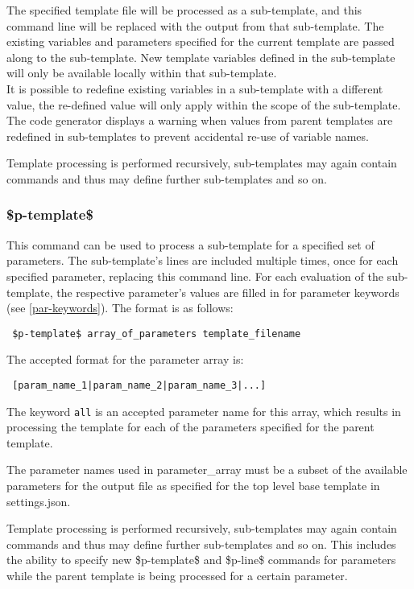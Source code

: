 \documentclass{settings/TU_Delft_Report}
\begin{document}
The specified template file will be processed as a sub-template, and this command line will be replaced with the output from that sub-template. The existing variables and parameters specified for the current template are passed along to the sub-template. New template variables defined in the sub-template will only be available locally within that sub-template.\\

It is possible to redefine existing variables in a sub-template with a different value, the re-defined value will only apply within the scope of the sub-template. The code generator displays a warning when values from parent templates are redefined in sub-templates to prevent accidental re-use of variable names.

Template processing is performed recursively, sub-templates may again contain commands and thus may define further sub-templates and so on.

\subsubsection{\$p-template\$} \label{p-template}
This command can be used to process a sub-template for a specified set of parameters. The sub-template's lines are included multiple times, once for each specified parameter, replacing this command line. For each evaluation of the sub-template, the respective parameter's values are filled in for parameter keywords (see \ref{par-keywords}). The format is as follows:
\begin{lstlisting}
 $p-template$ array_of_parameters template_filename
\end{lstlisting}
The accepted format for the parameter array is:
\begin{lstlisting}
 [param_name_1|param_name_2|param_name_3|...]
\end{lstlisting}
The keyword \lstinline{all} is an accepted parameter name for this array, which results in processing the template for each of the parameters specified for the parent template.

The parameter names used in parameter\_array must be a subset of the available parameters for the output file as specified for the top level base template in settings.json.

Template processing is performed recursively, sub-templates may again contain commands and thus may define further sub-templates and so on. This includes the ability to specify new \$p-template\$ and \$p-line\$ commands for parameters while the parent template is being processed for a certain parameter.
\end{document}
